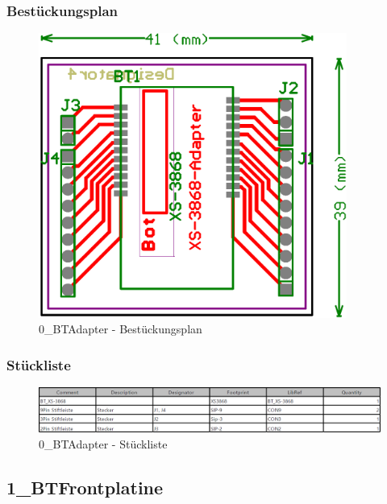 \subsubsection*{Bestückungsplan}
\begin{figure} [H]
	\centering
	\includegraphics[width=0.9\textwidth]{img/BTModul/adapter_Best.png}
	\caption{0\_BTAdapter - Bestückungsplan}
	\label {fig:8.10.2}
\end{figure}

\subsubsection*{Stückliste}
\begin{figure} [H]
	\centering
	\includegraphics[width=1\textwidth]{img/BTModul/adapter_Blist.png}
	\caption{0\_BTAdapter - Stückliste}
	\label {fig:8.10.3}
\end{figure}




\subsection{1\_BTFrontplatine}
